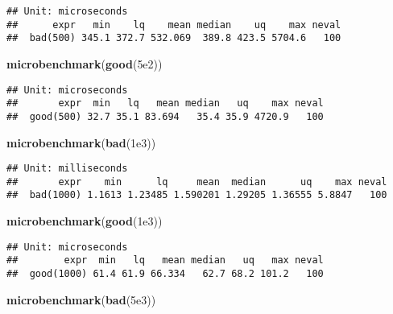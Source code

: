 \documentclass[
]{article}
\newenvironment{Shaded}{\begin{snugshade}}{\end{snugshade}}
\newcommand{\FloatTok}[1]{\textcolor[rgb]{0.00,0.00,0.81}{#1}}
\newcommand{\KeywordTok}[1]{\textcolor[rgb]{0.13,0.29,0.53}{\textbf{#1}}}
\newcommand{\NormalTok}[1]{#1}
\begin{document}
\begin{verbatim}
## Unit: microseconds
##      expr   min    lq    mean median    uq    max neval
##  bad(500) 345.1 372.7 532.069  389.8 423.5 5704.6   100
\end{verbatim}

\begin{Shaded}
\begin{Highlighting}[]
\KeywordTok{microbenchmark}\NormalTok{(}\KeywordTok{good}\NormalTok{(}\FloatTok{5e2}\NormalTok{))}
\end{Highlighting}
\end{Shaded}

\begin{verbatim}
## Unit: microseconds
##       expr  min   lq   mean median   uq    max neval
##  good(500) 32.7 35.1 83.694   35.4 35.9 4720.9   100
\end{verbatim}

\begin{Shaded}
\begin{Highlighting}[]
\KeywordTok{microbenchmark}\NormalTok{(}\KeywordTok{bad}\NormalTok{(}\FloatTok{1e3}\NormalTok{))}
\end{Highlighting}
\end{Shaded}

\begin{verbatim}
## Unit: milliseconds
##       expr    min      lq     mean  median      uq    max neval
##  bad(1000) 1.1613 1.23485 1.590201 1.29205 1.36555 5.8847   100
\end{verbatim}

\begin{Shaded}
\begin{Highlighting}[]
\KeywordTok{microbenchmark}\NormalTok{(}\KeywordTok{good}\NormalTok{(}\FloatTok{1e3}\NormalTok{))}
\end{Highlighting}
\end{Shaded}

\begin{verbatim}
## Unit: microseconds
##        expr  min   lq   mean median   uq   max neval
##  good(1000) 61.4 61.9 66.334   62.7 68.2 101.2   100
\end{verbatim}

\begin{Shaded}
\begin{Highlighting}[]
\KeywordTok{microbenchmark}\NormalTok{(}\KeywordTok{bad}\NormalTok{(}\FloatTok{5e3}\NormalTok{))}
\end{Highlighting}
\end{Shaded}
\end{document}
